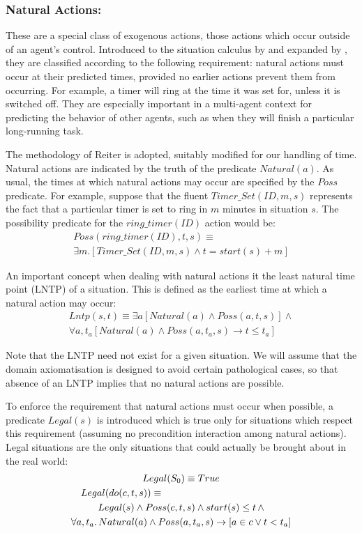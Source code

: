 \documentclass[letterpaper]{article}
\begin{document}
\subsubsection{Natural Actions:}
These are a special class of exogenous actions, those
actions which occur outside of an agent's control.
Introduced to the situation
calculus by \cite{pinto94temporal} and expanded by \cite{reiter96sc_nat_conc},
they are classified according to the following requirement: natural
actions must occur at their predicted times, provided no earlier actions
prevent them from occurring. For example, a timer will ring at the
time it was set for, unless it is switched off.
They are especially important in a multi-agent context for predicting the
behavior of other agents, such as when they will finish a particular
long-running task.

The methodology of Reiter is adopted, suitably
modified for our handling of time. Natural actions are indicated by the
truth of the predicate $Natural(a)$. As usual, the times at which
natural actions may occur are specified by the $Poss$ predicate.
For example, suppose that the fluent $Timer\_Set(ID,m,s)$ represents
the fact that a particular timer is set to ring in $m$ minutes in
situation $s$. The possibility predicate for the $ring\_timer(ID)$
action would be:
\begin{multline}
Poss(ring\_timer(ID),t,s)\equiv\\
\exists m.\left[Timer\_Set(ID,m,s)\wedge t=start(s)+m\right]
\end{multline}

An important concept when dealing with natural actions it the least
natural time point (LNTP) of a situation. This is defined as the earliest
time at which a natural action may occur:
\begin{multline}
\label{eqn:lntp_def}
Lntp(s,t)\equiv \exists a\left[Natural(a)\wedge Poss(a,t,s)\right]\wedge\\
\forall a,t_{a}\left[Natural(a)\wedge Poss(a,t_{a},s)\rightarrow t\leq t_{a}\right]
\end{multline}

Note that the LNTP need not exist for a given situation.
We will assume that the domain axiomatisation
is designed to avoid certain pathological cases, so that absence of an
LNTP implies that no natural actions are possible.

To enforce the requirement that natural actions must occur when possible,
a predicate $Legal(s)$ is introduced which is true only for situations
which respect this requirement (assuming no precondition interaction
among natural actions).  Legal situations are the only situations that could
actually be brought about in the real world:
\begin{multline}
\label{eqn:legal_def}
Legal(S_0) \equiv True\\
\shoveleft{Legal(do(c,t,s)) \equiv}\\
Legal(s)\wedge Poss(c,t,s)\wedge start(s)\leq t \, \wedge\\
\forall a,t_{a}.\,Natural(a)\wedge Poss(a,t_{a},s)\rightarrow\left[a\in c\vee t<t_{a}\right]
\end{multline}
\end{document}
